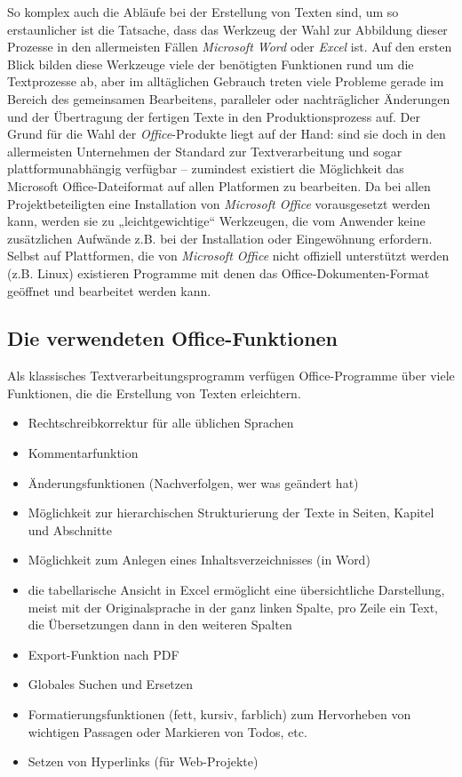 So komplex auch die Abläufe bei der Erstellung von Texten sind, um so erstaunlicher ist die Tatsache, dass das Werkzeug der Wahl zur Abbildung dieser Prozesse in den allermeisten Fällen \emph{Microsoft Word} oder \emph{Excel} ist. Auf den ersten Blick bilden diese Werkzeuge viele der benötigten Funktionen rund um die Textprozesse ab, aber im alltäglichen Gebrauch treten viele Probleme gerade im Bereich des gemeinsamen Bearbeitens, paralleler oder nachträglicher Änderungen und der Übertragung der fertigen Texte in den Produktionsprozess auf. Der Grund für die Wahl der \emph{Office}-Produkte liegt auf der Hand: sind sie doch in den allermeisten Unternehmen der Standard zur Textverarbeitung und sogar plattformunabhängig verfügbar – zumindest existiert die Möglichkeit das Microsoft Office-Dateiformat auf allen Platformen zu bearbeiten. Da bei allen Projektbeteiligten eine Installation von \emph{Microsoft Office} vorausgesetzt werden kann, werden sie zu „leichtgewichtige“ Werkzeugen, die vom Anwender keine zusätzlichen Aufwände z.B. bei der Installation oder Eingewöhnung erfordern. Selbst auf Plattformen, die von \emph{Microsoft Office} nicht offiziell unterstützt werden (z.B. Linux) existieren Programme mit denen das Office-Dokumenten-Format geöffnet und bearbeitet werden kann.

\subsection{Die verwendeten Office-Funktionen}

Als klassisches Textverarbeitungsprogramm verfügen Office-Programme über viele Funktionen, die die Erstellung von Texten erleichtern.

\begin{itemize}
\item{Rechtschreibkorrektur für alle üblichen Sprachen}
\item{Kommentarfunktion}
\item{Änderungsfunktionen (Nachverfolgen, wer was geändert hat)}
\item{Möglichkeit zur hierarchischen Strukturierung der Texte in Seiten, Kapitel und Abschnitte}
\item{Möglichkeit zum Anlegen eines Inhaltsverzeichnisses (in Word)}
\item{die tabellarische Ansicht in Excel ermöglicht eine übersichtliche Darstellung, meist mit der Originalsprache in der ganz linken Spalte, pro Zeile ein Text, die Übersetzungen dann in den weiteren Spalten}
\item{Export-Funktion nach PDF}
\item{Globales Suchen und Ersetzen}
\item{Formatierungsfunktionen (fett, kursiv, farblich) zum Hervorheben von wichtigen Passagen oder Markieren von Todos, etc.}
\item{Setzen von Hyperlinks (für Web-Projekte)}
\end{itemize}

